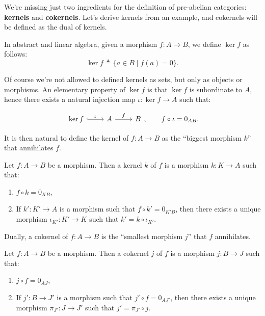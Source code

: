 \documentclass{beamer}
\begin{document}
\begin{frame}
    We're missing just two ingredients for the definition of pre-abelian categories:
    \textbf{kernels} and \textbf{cokernels}. Let's derive kernels from an example,
    and cokernels will be defined as the dual of kernels. \medskip
    
    
    In abstract and linear algebra, given a morphism $f : A \to B$, we define $\ker f$ as follows:
    \[
        \ker f \triangleq \{ a \in B \mid f(a) = 0 \}.
    \]
\end{frame}

\begin{frame}
    Of course we're not allowed to defined kernels as sets, but only as objects or morphisms.
    An elementary property of $\ker f$ is that $\ker f$ is subordinate to $A$, hence
    there exists a natural injection map $\iota : \ker f \to A$ such that:

    \[\begin{tikzcd}[ampersand replacement=\&]
        {\ker f} \& A \& B
        \arrow["\iota", hook, from=1-1, to=1-2]
        \arrow["f", from=1-2, to=1-3]
    \end{tikzcd}, \qquad f \circ \iota = 0_{AB}. \]
\end{frame}

\begin{frame}
    It is then natural to define the kernel of $f : A \to B$ as the ``biggest morphism $k$''
    that annihilates $f$. \medskip

    \begin{definition}
        Let $f : A \to B$ be a morphism. Then a kernel $k$ of $f$ is a morphism
        $k : K \to A$ such that:
        \begin{enumerate}
            \item $f \circ k = 0_{KB}$,
            \item If $k' : K' \to A$ is a morphism such that $f \circ k' = 0_{K'B}$, then
                there exists a unique morphism $\iota_{K'} : K' \to K$ such that
                $k' = k \circ \iota_{K'}$.
        \end{enumerate}
    \end{definition}
\end{frame}

\begin{frame}
    Dually, a cokernel of $f : A \to B$ is the ``smallest morphism $j$'' that
    $f$ annihilates. \medskip

    \begin{definition}
        Let $f : A \to B$ be a morphism. Then a cokernel $j$ of $f$ is a morphism
        $j : B \to J$ such that:
        \begin{enumerate}
            \item $j \circ f = 0_{AJ}$,
            \item If $j' : B \to J'$ is a morphism such that $j' \circ f = 0_{AJ'}$, then
                there exists a unique morphism $\pi_{J'} : J \to J'$ such that
                $j' = \pi_{J'} \circ j$.
        \end{enumerate}
    \end{definition}
\end{frame}
\end{document}
